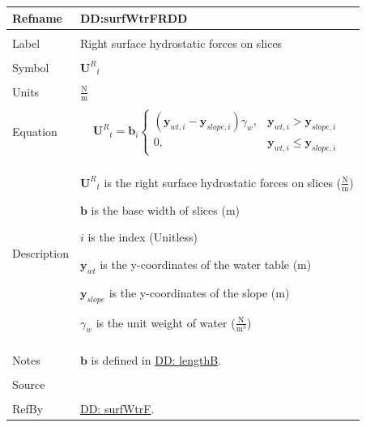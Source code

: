 \documentclass[12pt]{article}
\begin{document}
\noindent \begin{minipage}{\textwidth}
\begin{tabular}{p{} p{}}
\toprule \textbf{Refname} & \textbf{DD:surfWtrFRDD}
\label{DD:surfWtrFRDD}
\\ \midrule \\
Label & Right surface hydrostatic forces on slices
\\ \midrule \\
Symbol & ${{\mathbf{U}^{R}}_{t}}$
\\ \midrule \\
Units & $\frac{\text{N}}{\text{m}}$
\\ \midrule \\
Equation & \begin{displaymath}
           {{\mathbf{U}^{R}}_{t}}={\mathbf{b}}_{i} \begin{cases}
\left({\mathbf{y}_{wt,i}}-{\mathbf{y}_{slope,i}}\right) {γ_{w}}, & {\mathbf{y}_{wt,i}}>{\mathbf{y}_{slope,i}}\\
0, & {\mathbf{y}_{wt,i}}\leq{}{\mathbf{y}_{slope,i}}
\end{cases}
           \end{displaymath}
\\ \midrule \\
Description & \begin{symbDescription}
              \item{${{\mathbf{U}^{R}}_{t}}$ is the right surface hydrostatic forces on slices ($\frac{\text{N}}{\text{m}}$)}
              \item{$\mathbf{b}$ is the base width of slices (m)}
              \item{$i$ is the index (Unitless)}
              \item{${\mathbf{y}_{wt}}$ is the y-coordinates of the water table (m)}
              \item{${\mathbf{y}_{slope}}$ is the y-coordinates of the slope (m)}
              \item{${γ_{w}}$ is the unit weight of water ($\frac{\text{N}}{\text{m}^{3}}$)}
              \end{symbDescription}
\\ \midrule \\
Notes & $\mathbf{b}$ is defined in \hyperref[DD:lengthB]{DD: lengthB}.
\\ \midrule \\
Source & \cite{fredlund1977}
\\ \midrule \\
RefBy & \hyperref[DD:surfWtrF]{DD: surfWtrF}.
\\ \bottomrule \end{tabular}
\end{minipage}
\par~
\end{document}
